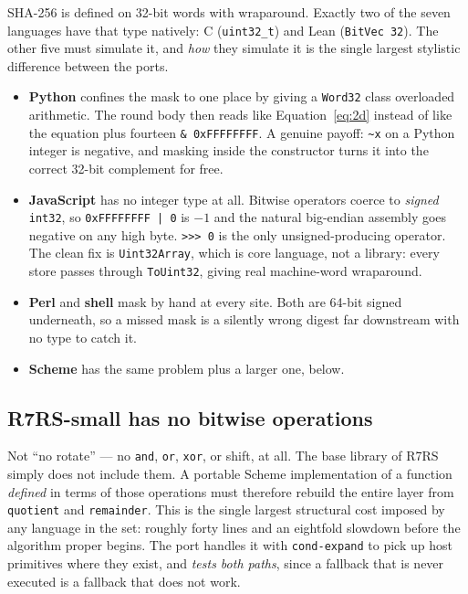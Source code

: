 \documentclass[11pt,a4paper]{article}
\newcommand{\code}[1]{\texttt{#1}}
\begin{document}
SHA-256 is defined on 32-bit words with wraparound. Exactly two of the seven
languages have that type natively: C (\code{uint32\_t}) and Lean
(\code{BitVec 32}). The other five must simulate it, and \emph{how} they
simulate it is the single largest stylistic difference between the ports.

\begin{itemize}[leftmargin=1.3em]
\item \textbf{Python} confines the mask to one place by giving a
  \code{Word32} class overloaded arithmetic. The round body then reads like
  Equation~\eqref{eq:2d} instead of like the equation plus fourteen
  \code{\& 0xFFFFFFFF}. A genuine payoff: \code{\textasciitilde x} on a Python
  integer is negative, and masking inside the constructor turns it into the
  correct 32-bit complement for free.
\item \textbf{JavaScript} has no integer type at all. Bitwise operators
  coerce to \emph{signed} \code{int32}, so \code{0xFFFFFFFF | 0} is $-1$ and
  the natural big-endian assembly goes negative on any high byte.
  \code{>>>\,0} is the only unsigned-producing operator. The clean fix is
  \code{Uint32Array}, which is core language, not a library: every store
  passes through \code{ToUint32}, giving real machine-word wraparound.
\item \textbf{Perl} and \textbf{shell} mask by hand at every site. Both are
  64-bit signed underneath, so a missed mask is a silently wrong digest far
  downstream with no type to catch it.
\item \textbf{Scheme} has the same problem plus a larger one, below.
\end{itemize}

\subsection{R7RS-small has no bitwise operations}

Not ``no rotate'' --- no \code{and}, \code{or}, \code{xor}, or shift, at all.
The base library of R7RS~\cite{r7rs} simply does not include them. A portable
Scheme implementation of a function \emph{defined} in terms of those
operations must therefore rebuild the entire layer from \code{quotient} and
\code{remainder}. This is the single largest structural cost imposed by any
language in the set: roughly forty lines and an eightfold slowdown before the
algorithm proper begins. The port handles it with \code{cond-expand} to pick
up host primitives where they exist, and \emph{tests both paths}, since a
fallback that is never executed is a fallback that does not work.
\end{document}
